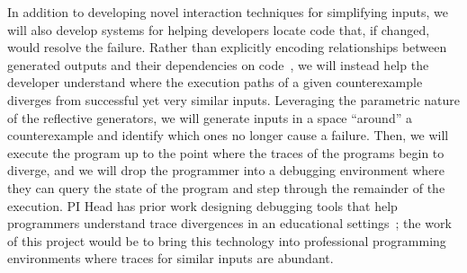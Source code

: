 In addition to developing novel interaction techniques for simplifying inputs,
we will also develop systems for helping developers locate code that, if
changed, would resolve the failure. Rather than explicitly encoding
relationships between generated outputs and their dependencies on
code~\cite{ref:ko2009finding}, we will instead help the developer
understand where the execution paths of a given counterexample diverges from
successful yet very similar inputs. Leveraging the parametric nature of the
reflective generators, we will generate inputs in a space ``around'' a
counterexample and identify which ones no longer cause a failure.  Then, we will
execute the program up to the point where the traces of the programs begin to
diverge, and we will drop the programmer into a debugging environment where
they can query the state of the program and step through the remainder of the
execution. PI Head has prior work designing debugging tools that help
programmers understand trace divergences in an educational
settings~\cite{ref:suzuki2017tracediff}; the work of this project would be to
bring this technology into professional programming environments where traces
for similar inputs are abundant.

\iflater
{}
%

\iflater {}\fi
\fi

